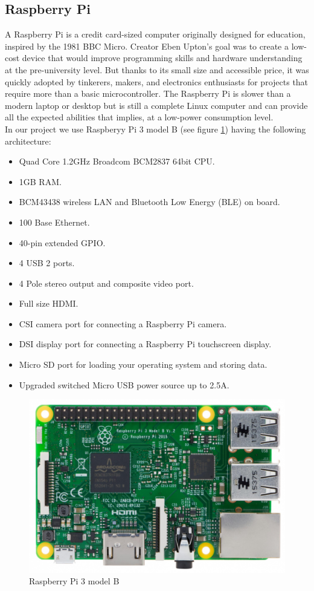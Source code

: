 \subsection{Raspberry Pi}
\hspace{2cm}A Raspberry Pi is a credit card-sized computer originally designed for education, inspired by the 1981 BBC Micro. Creator Eben Upton’s goal was to create a low-cost device that would improve programming skills and hardware understanding at the pre-university level. But thanks to its small size and accessible price, it was quickly adopted by tinkerers, makers, and electronics enthusiasts for projects that require more than a basic microcontroller.
The Raspberry Pi is slower than a modern laptop or desktop but is still a complete Linux computer and can provide all the expected abilities that implies, at a low-power consumption level. \cite{web006} \\
In our project we use Raspberyy Pi 3 model B (see figure \ref{fig:raspberryPi}) having the following architecture:
\begin{itemize}
    \item Quad Core 1.2GHz Broadcom BCM2837 64bit CPU.
    \item 1GB RAM.
    \item BCM43438 wireless LAN and Bluetooth Low Energy (BLE) on board.
    \item 100 Base Ethernet.
    \item 40-pin extended GPIO.
    \item 4 USB 2 ports.
    \item 4 Pole stereo output and composite video port.
    \item Full size HDMI.
    \item CSI camera port for connecting a Raspberry Pi camera.
    \item DSI display port for connecting a Raspberry Pi touchscreen display.
    \item Micro SD port for loading your operating system and storing data.
    \item Upgraded switched Micro USB power source up to 2.5A.\cite{web018}
\end{itemize}

\begin{figure}[H]%
    \center%
    \includegraphics[width=.5\textwidth]
    {images/Alzahraa/raspberryPi.png}%
    \caption[Raspberry Pi]{Raspberry Pi 3 model B}\label{fig:raspberryPi}%
  \end{figure} 


